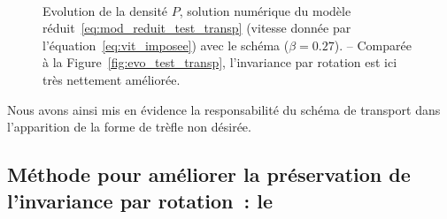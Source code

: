 \documentclass[main.tex]{subfiles}
\begin{document}
\begin{figure}
\centering
\\
\caption{Evolution de la densité $P$, solution numérique du modèle réduit~\eqref{eq:mod_reduit_test_transp} (vitesse donnée par l'équation~\eqref{eq:vit_imposee}) avec le schéma \twinweno ($\beta=0.27$). -- Comparée à la Figure~\ref{fig:evo_test_transp}, l'invariance par rotation est ici très nettement améliorée. \label{fig:evo_test_transp_twinweno}}
\end{figure}
Nous avons ainsi mis en évidence la responsabilité du schéma de transport dans l'apparition de la forme de trèfle non désirée.


\subsection{Méthode pour améliorer la préservation de l'invariance par rotation~: le \twinweno  \label{sec:twinweno}}
%
\end{document}
